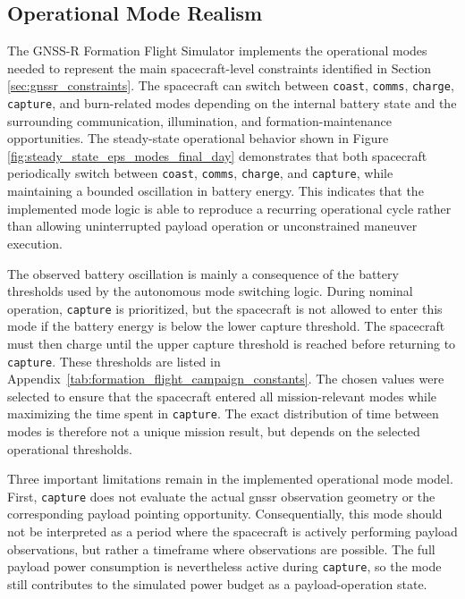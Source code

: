 \subsection{Operational Mode Realism}

The GNSS-R Formation Flight Simulator implements the operational modes needed to represent the main spacecraft-level constraints identified in Section \ref{sec:gnssr_constraints}. The spacecraft can switch between \texttt{coast}, \texttt{comms}, \texttt{charge}, \texttt{capture}, and burn-related modes depending on the internal battery state and the surrounding communication, illumination, and formation-maintenance opportunities. The steady-state operational behavior shown in Figure \ref{fig:steady_state_eps_modes_final_day} demonstrates that both spacecraft periodically switch between \texttt{coast}, \texttt{comms}, \texttt{charge}, and \texttt{capture}, while maintaining a bounded oscillation in battery energy. This indicates that the implemented mode logic is able to reproduce a recurring operational cycle rather than allowing uninterrupted payload operation or unconstrained maneuver execution.

The observed battery oscillation is mainly a consequence of the battery thresholds used by the autonomous mode switching logic. During nominal operation, \texttt{capture} is prioritized, but the spacecraft is not allowed to enter this mode if the battery energy is below the lower capture threshold. The spacecraft must then charge until the upper capture threshold is reached before returning to \texttt{capture}. These thresholds are listed in Appendix~\ref{tab:formation_flight_campaign_constants}. The chosen values were selected to ensure that the spacecraft entered all mission-relevant modes while maximizing the time spent in \texttt{capture}. The exact distribution of time between modes is therefore not a unique mission result, but depends on the selected operational thresholds.

Three important limitations remain in the implemented operational mode model. First, \texttt{capture} does not evaluate the actual \gls{gnssr} observation geometry or the corresponding payload pointing opportunity. Consequentially, this mode should not be interpreted as a period where the spacecraft is actively performing payload observations, but rather a timeframe where observations are possible. The full payload power consumption is nevertheless active during \texttt{capture}, so the mode still contributes to the simulated power budget as a payload-operation state. 

